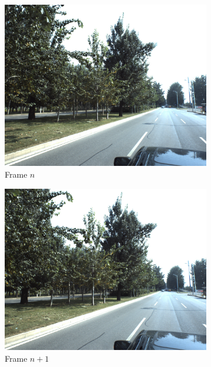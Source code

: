 \documentclass{article}
\begin{document}
\begin{figure}[h]
	\centering
\begin{subfigure}{0.3\textwidth}
	\includegraphics[width=\textwidth]{170908_061541883_Camera_5.jpg}
	\caption{Frame $n$}
\end{subfigure}
\hspace{0.1in}
\begin{subfigure}{0.3\textwidth}
	\includegraphics[width=\textwidth]{170908_061542022_Camera_5.jpg}
	\caption{Frame $n+1$}
\end{subfigure}
\begin{subfigure}{0.3\textwidth}

\end{subfigure}
\end{figure}
\end{document}
